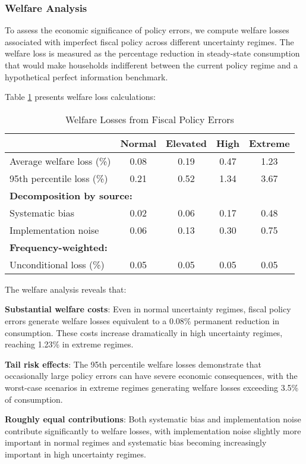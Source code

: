 \documentclass[5p,authoryear]{elsarticle}
\begin{document}
\subsubsection{Welfare Analysis}

To assess the economic significance of policy errors, we compute welfare losses associated with imperfect fiscal policy across different uncertainty regimes. The welfare loss is measured as the percentage reduction in steady-state consumption that would make households indifferent between the current policy regime and a hypothetical perfect information benchmark.

Table \ref{tab:welfare_losses} presents welfare loss calculations:

\begin{table}[h!]
\centering
\caption{Welfare Losses from Fiscal Policy Errors}
\label{tab:welfare_losses}
\begin{tabular}{lcccc}
\toprule
& Normal & Elevated & High & Extreme \\
\midrule
Average welfare loss (\%) & 0.08 & 0.19 & 0.47 & 1.23 \\
95th percentile loss (\%) & 0.21 & 0.52 & 1.34 & 3.67 \\
\midrule
\multicolumn{5}{l}{\textbf{Decomposition by source:}} \\
Systematic bias & 0.02 & 0.06 & 0.17 & 0.48 \\
Implementation noise & 0.06 & 0.13 & 0.30 & 0.75 \\
\midrule
\multicolumn{5}{l}{\textbf{Frequency-weighted:}} \\
Unconditional loss (\%) & 0.05 & 0.05 & 0.05 & 0.05 \\
\bottomrule
\end{tabular}
\end{table}

The welfare analysis reveals that:

\textbf{Substantial welfare costs}: Even in normal uncertainty regimes, fiscal policy errors generate welfare losses equivalent to a 0.08\% permanent reduction in consumption. These costs increase dramatically in high uncertainty regimes, reaching 1.23\% in extreme regimes.

\textbf{Tail risk effects}: The 95th percentile welfare losses demonstrate that occasionally large policy errors can have severe economic consequences, with the worst-case scenarios in extreme regimes generating welfare losses exceeding 3.5\% of consumption.

\textbf{Roughly equal contributions}: Both systematic bias and implementation noise contribute significantly to welfare losses, with implementation noise slightly more important in normal regimes and systematic bias becoming increasingly important in high uncertainty regimes.
\end{document}
